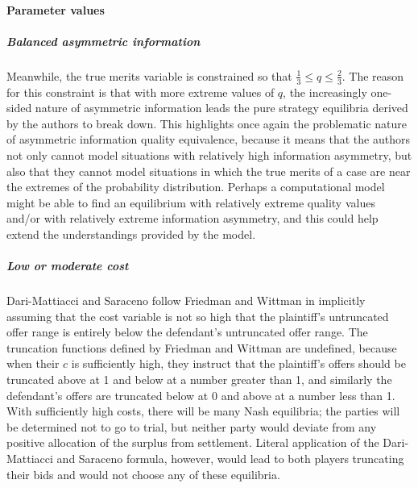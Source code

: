 \documentclass{article}
\begin{document}
\paragraph{Parameter values}
\subparagraph{Balanced asymmetric information}Meanwhile, the true merits variable is constrained so that $\frac{1}{3} \leq q \leq \frac{2}{3}$. The reason for this constraint is that with more extreme values of $q$, the increasingly one-sided nature of asymmetric information leads the pure strategy equilibria derived by the authors to break down. This highlights once again the problematic nature of asymmetric information quality equivalence, because it means that the authors not only cannot model situations with relatively high information asymmetry, but also that they cannot model situations in which the true merits of a case are near the extremes of the probability distribution. Perhaps a computational model might be able to find an equilibrium with relatively extreme quality values and/or with relatively extreme information asymmetry, and this could help extend the understandings provided by the model.

\subparagraph{Low or moderate cost}Dari-Mattiacci and Saraceno follow Friedman and Wittman in implicitly assuming that the cost variable is not so high that the plaintiff's untruncated offer range is entirely below the defendant's untruncated offer range. The truncation functions defined by Friedman and Wittman are undefined, because when their $c$ is sufficiently high, they instruct that the plaintiff's offers should be truncated above at 1 and below at a number greater than 1, and similarly the defendant's offers are truncated below at 0 and above at a number less than 1. With sufficiently high costs, there will be many Nash equilibria; the parties will be determined not to go to trial, but neither party would deviate from any positive allocation of the surplus from settlement. Literal application of the Dari-Mattiacci and Saraceno formula, however, would lead to both players truncating their bids and would not choose any of these equilibria.
\end{document}

